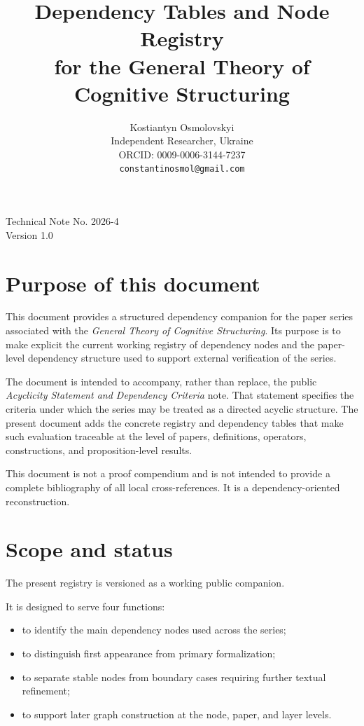 \documentclass[11pt,a4paper]{article}
\title{Dependency Tables and Node Registry\\ for the General Theory of Cognitive Structuring}
\author{
	Kostiantyn Osmolovskyi\\
	\small Independent Researcher, Ukraine\\
	\small ORCID: 0009-0006-3144-7237\\
	\small \texttt{constantinosmol@gmail.com}
}
\date{}
\begin{document}
	\maketitle

\begin{center}
	\small
	Technical Note No. 2026-4\\
	Version 1.0
\end{center}

\vspace{0.5em}
	
	\maketitle
	
	\section{Purpose of this document}
	
	This document provides a structured dependency companion for the paper series associated with the
	\emph{General Theory of Cognitive Structuring}. Its purpose is to make explicit the current working
	registry of dependency nodes and the paper-level dependency structure used to support external
	verification of the series.
	
	The document is intended to accompany, rather than replace, the public
	\emph{Acyclicity Statement and Dependency Criteria} note. That statement specifies the criteria
	under which the series may be treated as a directed acyclic structure. The present document adds
	the concrete registry and dependency tables that make such evaluation traceable at the level of
	papers, definitions, operators, constructions, and proposition-level results.
	
	This document is not a proof compendium and is not intended to provide a complete bibliography
	of all local cross-references. It is a dependency-oriented reconstruction.
	
	\section{Scope and status}
	
	The present registry is versioned as a working public companion.
	
	It is designed to serve four functions:
	\begin{itemize}[leftmargin=2em]
		\item to identify the main dependency nodes used across the series;
		\item to distinguish first appearance from primary formalization;
		\item to separate stable nodes from boundary cases requiring further textual refinement;
		\item to support later graph construction at the node, paper, and layer levels.
	\end{itemize}
	
\end{document}
